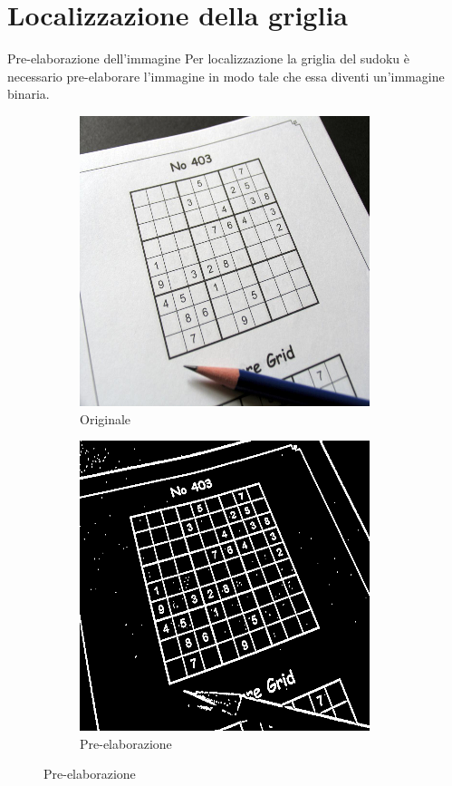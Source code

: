 \documentclass[10pt]{beamer}
\begin{document}
\section{Localizzazione della griglia}

\begin{frame}[fragile]{Pre-elaborazione dell'immagine}
    Per localizzazione la griglia del sudoku è necessario pre-elaborare
    l'immagine in modo tale che essa diventi un'immagine binaria.

    \begin{figure}[h]
        \def\subwidth{0.50}
        \def\imgwidth{0.70}
        \centering
        \begin{subfigure}[b]{\subwidth\linewidth}
            \centering
            \includegraphics[width=\imgwidth\linewidth]{imgs/input.png}
            \caption{Originale}\label{subfig:input}
        \end{subfigure}%
        \begin{subfigure}[b]{\subwidth\linewidth}
            \centering
            \includegraphics[width=\imgwidth\linewidth]{imgs/process_out.png}
            \caption{Pre-elaborazione}\label{subfig:preprocess}
        \end{subfigure}
    \end{figure}
\end{frame}
\end{document}
